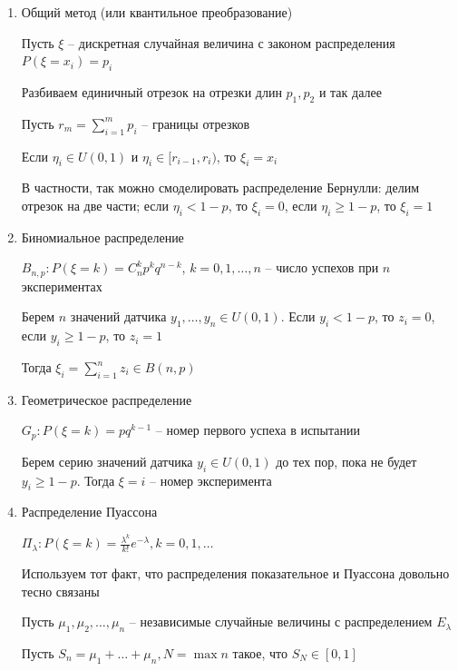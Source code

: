 \begin{enumerate}
    \begin{enumerate}[label*=\Roman*. ]
        \item Общий метод (или квантильное преобразование)

        Пусть $\xi$ -- дискретная случайная величина с законом распределения $P(\xi = x_i) = p_i$

        Разбиваем единичный отрезок на отрезки длин $p_1, p_2$ и так далее

        Пусть $r_m = \sum_{i = 1}^m p_i$ -- границы отрезков

        Если $\eta_i \in U(0, 1)$ и $\eta_i \in [r_{i-1}, r_{i})$, то $\xi_i = x_i$

        В частности, так можно смоделировать распределение Бернулли: делим отрезок на две части; если $\eta_i < 1 - p$, то $\xi_i = 0$, если $\eta_i \geq 1 - p$, то $\xi_i = 1$

        \item Биномиальное распределение

        $B_{n,p}: P(\xi = k) = C_n^k p^k q^{n - k}$, $k = 0, 1, \dots, n$ -- число успехов при $n$ экспериментах
        
        Берем $n$ значений датчика $y_1, \dots, y_n \in U(0, 1)$. Если $y_i < 1 - p$, то $z_i = 0$, если $y_i \geq 1 - p$, то $z_i = 1$

        Тогда $\xi_i = \sum_{i = 1}^n z_i \in B(n, p)$

        \item Геометрическое распределение

        $G_p: P(\xi = k) = p q^{k - 1}$ -- номер первого успеха в испытании

        Берем серию значений датчика $y_i \in U(0, 1)$ до тех пор, пока не будет $y_i \geq 1 - p$. Тогда $\xi = i$ -- номер эксперимента

        \item Распределение Пуассона

        $\Pi_\lambda: P(\xi = k) = \frac{\lambda^k}{k!} e^{-\lambda}, k = 0, 1, \dots$

        Используем тот факт, что распределения показательное и Пуассона довольно тесно связаны

        \begin{MyTheorem}
            \Ths Пусть $\mu_1, \mu_2, \dots, \mu_n$ -- независимые случайные величины с распределением $E_\lambda$

            Пусть $S_n = \mu_1 + \dots + \mu_n, N = \max n$ такое, что $S_N \in [0, 1]$


\end{MyTheorem}
\end{enumerate}
\end{enumerate}
